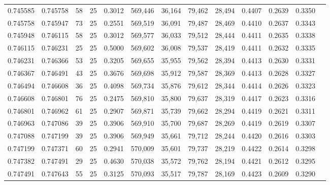 \begin{tabular}{rrrrrrrrrrrrr}
0.745585 & 0.745758 &    58 &  25 &                                     0.3012 & 569,446 &  36,164 &  79,462 &  28,494 & 0.4407 & 0.2639 & 0.3350 \\
0.745758 & 0.745947 &    73 &  25 &                                     0.2551 & 569,519 &  36,091 &  79,487 &  28,469 & 0.4410 & 0.2637 & 0.3343 \\
0.745948 & 0.746115 &    58 &  25 &                                     0.3012 & 569,577 &  36,033 &  79,512 &  28,444 & 0.4411 & 0.2635 & 0.3338 \\
0.746115 & 0.746231 &    25 &  25 &                                     0.5000 & 569,602 &  36,008 &  79,537 &  28,419 & 0.4411 & 0.2632 & 0.3335 \\
0.746231 & 0.746366 &    53 &  25 &                                     0.3205 & 569,655 &  35,955 &  79,562 &  28,394 & 0.4413 & 0.2630 & 0.3331 \\
0.746367 & 0.746491 &    43 &  25 &                                     0.3676 & 569,698 &  35,912 &  79,587 &  28,369 & 0.4413 & 0.2628 & 0.3327 \\
0.746494 & 0.746608 &    36 &  25 &                                     0.4098 & 569,734 &  35,876 &  79,612 &  28,344 & 0.4414 & 0.2626 & 0.3323 \\
0.746608 & 0.746801 &    76 &  25 &                                     0.2475 & 569,810 &  35,800 &  79,637 &  28,319 & 0.4417 & 0.2623 & 0.3316 \\
0.746801 & 0.746962 &    61 &  25 &                                     0.2907 & 569,871 &  35,739 &  79,662 &  28,294 & 0.4419 & 0.2621 & 0.3311 \\
0.746963 & 0.747086 &    39 &  25 &                                     0.3906 & 569,910 &  35,700 &  79,687 &  28,269 & 0.4419 & 0.2619 & 0.3307 \\
0.747088 & 0.747199 &    39 &  25 &                                     0.3906 & 569,949 &  35,661 &  79,712 &  28,244 & 0.4420 & 0.2616 & 0.3303 \\
0.747199 & 0.747371 &    60 &  25 &                                     0.2941 & 570,009 &  35,601 &  79,737 &  28,219 & 0.4422 & 0.2614 & 0.3298 \\
0.747382 & 0.747491 &    29 &  25 &                                     0.4630 & 570,038 &  35,572 &  79,762 &  28,194 & 0.4421 & 0.2612 & 0.3295 \\
0.747491 & 0.747643 &    55 &  25 &                                     0.3125 & 570,093 &  35,517 &  79,787 &  28,169 & 0.4423 & 0.2609 & 0.3290 \\

\end{tabular}
